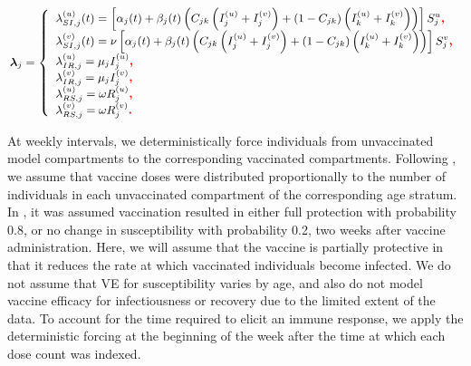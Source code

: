 \begin{equation}\small
\label{eqn:flu_sirs_rates}
\boldsymbol{\lambda}_{j} = \left\lbrace
\begin{array}{ll}
\lambda_{SI,j}^{(u)}(t) = \left [\alpha_{j}(t) + \beta_{j}(t)\left (C_{jk}\left (I_{j}^{(u)} + I_{j}^{(v)}\right ) + (1-C_{jk})\left (I_{k}^{(u)} + I_{k}^{(v)}\right )\right )\right ]S_{j}^{u}\textbf{\color{red}{,}} \\ 
\lambda_{SI,j}^{(v)}(t) = \nu\left [\alpha_{j}(t) + \beta_{j}(t)\left (C_{jk}\left (I_{j}^{(u)} + I_{j}^{(v)}\right ) + (1-C_{jk})\left (I_{k}^{(u)} + I_{k}^{(v)}\right )\right )\right ]S_{j}^{v}\textbf{\color{red}{,}}\\
\lambda_{IR,j}^{(u)} = \mu_{j} I_{j}^{(u)}\textbf{\color{red}{,}} \\
\lambda_{IR,j}^{(v)} = \mu_{j} I_{j}^{(v)}\textbf{\color{red}{,}} \\
\lambda_{RS,j}^{(u)} = \omega R_{j}^{(u)}\textbf{\color{red}{,}} \\
\lambda_{RS,j}^{(v)} = \omega R_{j}^{(v)}\textbf{\color{red}{.}}
\end{array}
\right .
\end{equation}

At weekly intervals, we deterministically force individuals from unvaccinated model compartments to the corresponding vaccinated compartments. Following \cite{shubin2016revealing}, we assume that vaccine doses were distributed proportionally to the number of individuals in each unvaccinated compartment of the corresponding age stratum. In \cite{shubin2016revealing}, it was assumed vaccination resulted in either full protection with probability 0.8, or no change in susceptibility with probability 0.2, two weeks after vaccine administration. Here, we will assume that the vaccine is partially protective in that it reduces the rate at which vaccinated individuals become infected. We do not assume that VE for susceptibility varies by age, and also do not model vaccine efficacy for infectiousness or recovery due to the limited extent of the data. To account for the time required to elicit an immune response, we apply the deterministic forcing at the beginning of the week after the time at which each dose count was indexed.

